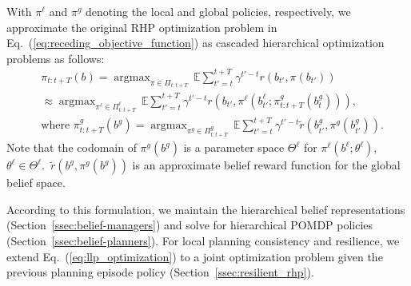 \documentclass[letterpaper]{article} %
\newcommand{\phdone}[1]{} %
\newcommand{\argmax}{\mathop{\mathrm{argmax}}}
\begin{document}
With $\pi^\ell$ and $\pi^g$ denoting the local and global policies, respectively, we approximate the original RHP optimization problem in Eq.~(\ref{eq:receding_objective_function}) as cascaded hierarchical optimization problems as follows:
\begin{align}
  &\pi_{t:t+T}(b)
  = \argmax_{\pi \in \Pi_{t:t+T}} \, \mathbb{E} \sum_{t'=t}^{t+T} \gamma^{t'-t} r(b_{t'}, \pi(b_{t'}))
  \nonumber \\
  & \approx \argmax_{\pi^\ell \in \Pi^\ell_{t:t+T}} \, \mathbb{E} \sum_{t'=t}^{t+T} \gamma^{t'-t} r(b_{t'}, \pi^\ell(b^\ell_{t'}; \pi_{t:t+T}^g(b^g_t))),
  \label{eq:llp_optimization}
  \\
  &\text{where }
  \pi_{t:t+T}^g(b^g) = \argmax_{\pi^g \in \Pi^g_{t:t+T}} \, \mathbb{E} \sum_{t'=t}^{t+T} \gamma^{t'-t} \tilde{r}(b^g_{t'}, \pi^g(b^g_{t'})).
  \label{eq:glp_optimization}
\end{align}
Note that the codomain of $\pi^g(b^g)$ is a parameter space $\Theta^\ell$ for $\pi^\ell(b^\ell; \theta^\ell)$, $\theta^\ell \!\! \in \! \Theta^\ell\!$.\,
$\tilde{r}(b^g, \pi^g(b^g))$ is an approximate belief reward function for the global belief space.

\phdone{Section Structure}
According to this formulation, we maintain the hierarchical belief representations (Section~\ref{ssec:belief-managers}) and solve for hierarchical POMDP policies (Section~\ref{ssec:belief-planners}).
For local planning consistency and resilience, we extend Eq.~(\ref{eq:llp_optimization}) to a joint optimization problem given the previous planning episode policy (Section~\ref{ssec:resilient_rhp}).




\end{document}
